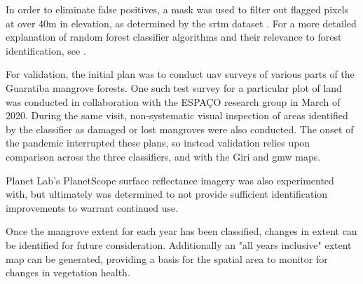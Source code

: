 In order to eliminate false positives, a mask was used to filter out flagged pixels at over 40m in elevation, as determined by the \ac{srtm} dataset \cite{jarvisHolefilledSRTMGlobe2008}. For a more detailed explanation of random forest classifier algorithms and their relevance to forest identification, see \cite{jhonnerieRandomForestClassification2015}.

For validation, the initial plan was to conduct \ac{uav} surveys of various parts of the Guaratiba mangrove forests. One such test survey for a particular plot of land was conducted in collaboration with the ESPAÇO research group in March of 2020. During the same visit, non-systematic visual inspection of areas identified by the classifier as damaged or lost mangroves were also conducted. The onset of the pandemic interrupted these plans, so instead validation relies upon comparison across the three classifiers, and with the Giri and \ac{gmw} maps.

Planet Lab's PlanetScope surface reflectance imagery was also experimented with, but ultimately was determined to not provide sufficient identification improvements to warrant continued use. 

Once the mangrove extent for each year has been classified, changes in extent can be identified for future consideration. Additionally an "all years inclusive" extent map can be generated, providing a basis for the spatial area to monitor for changes in vegetation health. 



